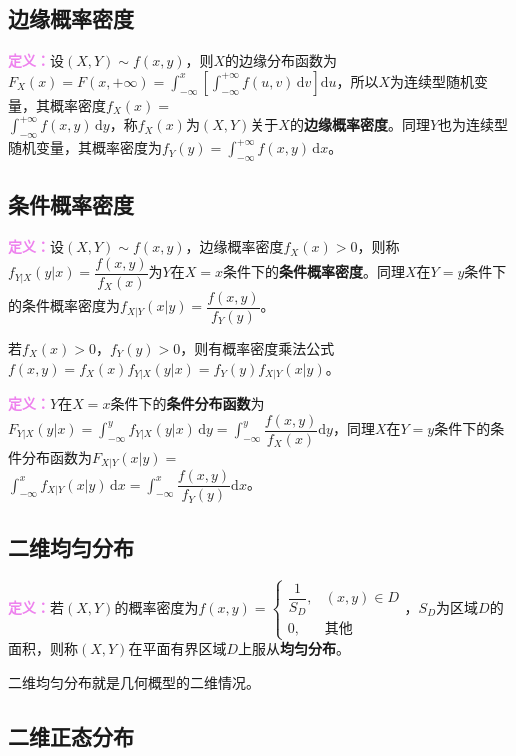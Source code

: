 \documentclass[UTF8, 12pt]{ctexart}
\begin{document}
\subsection{边缘概率密度}

\textcolor{violet}{\textbf{定义：}}设$(X,Y)\sim f(x,y)$，则$X$的边缘分布函数为$F_X(x)=F(x,+\infty)=\int_{-\infty}^x\left[\int_{-\infty}^{+\infty}f(u,v)\,\textrm{d}v\right]\textrm{d}u$，所以$X$为连续型随机变量，其概率密度$f_X(x)=$\\$\int_{-\infty}^{+\infty}f(x,y)\,\textrm{d}y$，称$f_X(x)$为$(X,Y)$关于$X$的\textbf{边缘概率密度}。同理$Y$也为连续型随机变量，其概率密度为$f_Y(y)=\int_{-\infty}^{+\infty}f(x,y)\,\textrm{d}x$。

\subsection{条件概率密度}

\textcolor{violet}{\textbf{定义：}}设$(X,Y)\sim f(x,y)$，边缘概率密度$f_X(x)>0$，则称$f_{Y|X}(y|x)=\dfrac{f(x,y)}{f_X(x)}$为$Y$在$X=x$条件下的\textbf{条件概率密度}。同理$X$在$Y=y$条件下的条件概率密度为$f_{X|Y}(x|y)=\dfrac{f(x,y)}{f_Y(y)}$。

若$f_X(x)>0$，$f_Y(y)>0$，则有概率密度乘法公式$f(x,y)=f_X(x)f_{Y|X}(y|x)=f_Y(y)f_{X|Y}(x|y)$。

\textcolor{violet}{\textbf{定义：}}$Y$在$X=x$条件下的\textbf{条件分布函数}为$F_{Y|X}(y|x)=\int_{-\infty}^yf_{Y|X}(y|x)\,\textrm{d}y=\displaystyle{\int_{-\infty}^y\dfrac{f(x,y)}{f_X(x)}\textrm{d}y}$，同理$X$在$Y=y$条件下的条件分布函数为$F_{X|Y}(x|y)=$\\$\int_{-\infty}^xf_{X|Y}(x|y)\,\textrm{d}x=\displaystyle{\int_{-\infty}^x\dfrac{f(x,y)}{f_Y(y)}}\textrm{d}x$。

\subsection{二维均匀分布}

\textcolor{violet}{\textbf{定义：}}若$(X,Y)$的概率密度为$f(x,y)=\left\{\begin{array}{ll}
    \dfrac{1}{S_D}, & (x,y)\in D \\
    0, & \text{其他}
\end{array}\right.$，$S_D$为区域$D$的面积，则称$(X,Y)$在平面有界区域$D$上服从\textbf{均匀分布}。

二维均匀分布就是几何概型的二维情况。

\subsection{二维正态分布}
\end{document}
